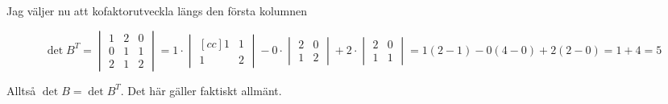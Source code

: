 \documentclass[../../main.tex]{subfiles}
\begin{document}
\begin{solution}{11}
Jag väljer nu att kofaktorutveckla längs den första kolumnen

$$
\det B^T = \begin{vmatrix}
1&2&0\\
0&1&1\\
2&1&2
\end{vmatrix}
= 1\cdot \begin{vmatrix}[cc]
1& 1\\ 
1&2
\end{vmatrix}
- 0\cdot \begin{vmatrix}
2 & 0\\
1 & 2
\end{vmatrix}
+ 2\cdot \begin{vmatrix}
2&0\\
1&1
\end{vmatrix}
= 1(2-1) - 0(4-0) + 2(2 - 0) = 1 + 4 = 5
$$

Alltså $\det B = \det B^T$. Det här gäller faktiskt allmänt.

\end{solution}
\end{document}
